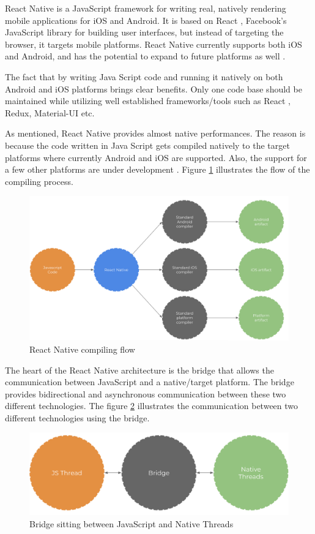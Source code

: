 React Native is a JavaScript framework for writing real, natively rendering mobile applications for iOS and Android. It is based on React \cite{react}, Facebook's JavaScript library for building user interfaces, but instead of targeting the browser, it targets mobile platforms. React Native currently supports both iOS and Android, and has the potential to expand to future platforms as well \cite{rn_oreilly}.

The fact that by writing Java Script code and running it natively on both Android and iOS platforms brings clear benefits. Only one code base should be maintained while utilizing well established frameworks/tools such as React \cite{react}, Redux\cite{redux}, Material-UI \cite{material_ui} etc. 

As mentioned, React Native provides almost native performances. The reason is because the code written in Java Script gets compiled natively to the target platforms where currently Android and iOS are supported. Also, the support for a few other platforms are under development \cite{rn_platform_development}. Figure \ref{fig:rn_compiling} illustrates the flow of the compiling process. 

\begin{figure}[ht]
\centering
\includegraphics[width=0.7\columnwidth]{figures/rn-compiler.png}
\caption{React Native compiling flow \cite{rn_bridge_article}}
\label{fig:rn_compiling}
\end{figure}

The heart of the React Native architecture is the bridge that allows the communication between JavaScript and a native/target platform. The bridge provides bidirectional and asynchronous communication between these two different technologies. The figure \ref{fig:rn_bridge} illustrates the communication between two different technologies using the bridge. 


\begin{figure}[ht]
\centering
\includegraphics[width=0.7\columnwidth]{figures/rn-bridge.png}
\caption{Bridge sitting between JavaScript and Native Threads \cite{rn_bridge_article}}
\label{fig:rn_bridge}
\end{figure}

